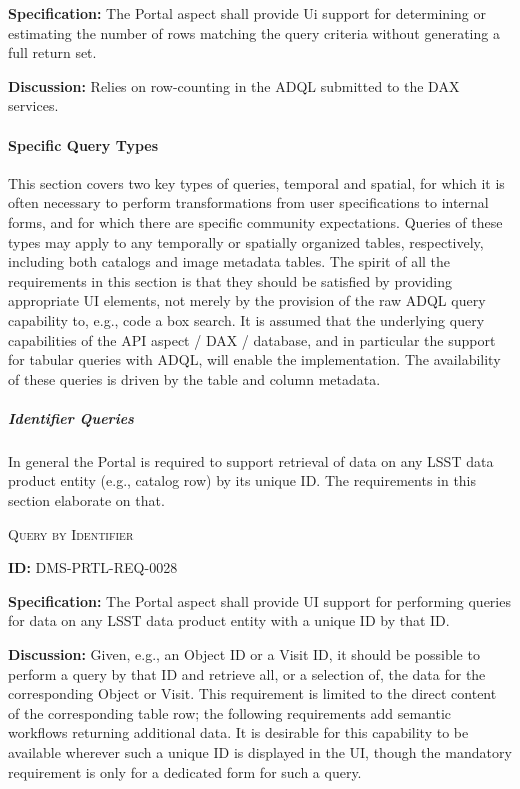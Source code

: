 \documentclass[SE,toc,lsstdraft]{lsstdoc}
\begin{document}
\textbf{Specification:}
The Portal aspect shall provide Ui support for determining or estimating the number of rows matching the query criteria without generating a full return set.

\textbf{Discussion:}
Relies on row-counting in the ADQL submitted to the DAX services.

\paragraph{Specific Query Types}\hfill  %

This section covers two key types of queries, temporal and spatial, for which it is often necessary to perform transformations from user specifications to internal forms, and for which there are specific community expectations.
Queries of these types may apply to any temporally or spatially organized tables, respectively, including both catalogs and image metadata tables.
The spirit of all the requirements in this section is that they should be satisfied by providing appropriate UI elements, not merely by the provision of the raw ADQL query capability to, e.g., code a box search.
It is assumed that the underlying query capabilities of the API aspect / DAX / database, and in particular the support for tabular queries with ADQL, will enable the implementation.
The availability of these queries is driven by the table and column metadata.

\subparagraph{Identifier Queries}\hfill  %

In general the Portal is required to support retrieval of data on any LSST data product entity (e.g., catalog row) by its unique ID.  The requirements in this section elaborate on that.

\textsc{Query by Identifier}

\label{DMS-PRTL-REQ-0028}
\textbf{ID:} DMS-PRTL-REQ-0028

\textbf{Specification:}
The Portal aspect shall provide UI support for performing queries for data on any LSST data product entity with a unique ID by that ID.

\textbf{Discussion:}
Given, e.g., an Object ID or a Visit ID, it should be possible to perform a query by that ID and retrieve all, or a selection of, the data for the corresponding Object or Visit.  This requirement is limited to the direct content of the corresponding table row; the following requirements add semantic workflows returning additional data.
It is desirable for this capability to be available wherever such a unique ID is displayed in the UI, though the mandatory requirement is only for a dedicated form for such a query.
\end{document}
